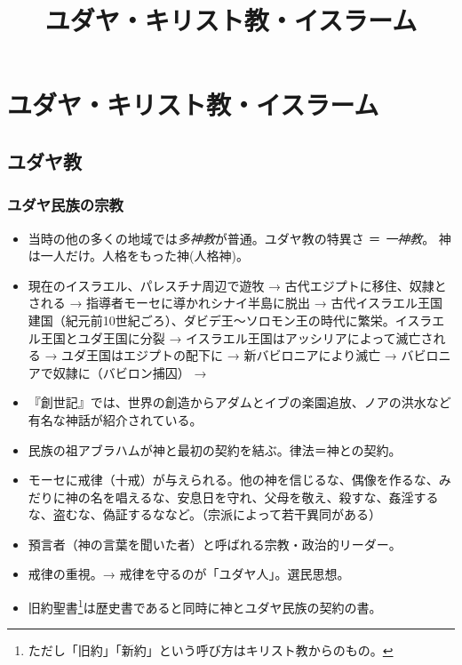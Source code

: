 \documentclass[uplatex,dvipdfmx]{jsarticle} \usepackage{mystyle}%
\title{ユダヤ・キリスト教・イスラーム}
\begin{document}
\maketitle


\else\chapter{ユダヤ・キリスト教・イスラーム}

\fi
\section{ユダヤ教}


\subsection{ユダヤ民族の宗教}






\begin{itemize}
\item 当時の他の多くの地域では\emph{多神教}が普通。ユダヤ教の特異さ ＝ \emph{一神教}。
  神は一人だけ。人格をもった神(人格神)。
\item 現在のイスラエル、パレスチナ周辺で遊牧 → 古代エジプトに移住、奴隷とされる → 指導者モーセに導かれシナイ半島に脱出 → 古代イスラエル王国建国（紀元前10世紀ごろ）、ダビデ王〜ソロモン王の時代に繁栄。イスラエル王国とユダ王国に分裂 → イスラエル王国はアッシリアによって滅亡される → ユダ王国はエジプトの配下に → 新バビロニアにより滅亡 → バビロニアで奴隷に（バビロン捕囚） → 
\item 『創世記』では、世界の創造からアダムとイブの楽園追放、ノアの洪水など有名な神話が紹介されている。
\item 民族の祖アブラハムが神と最初の契約を結ぶ。律法＝神との契約。
\item モーセに戒律（十戒）が与えられる。他の神を信じるな、偶像を作るな、みだりに神の名を唱えるな、安息日を守れ、父母を敬え、殺すな、姦淫するな、盗むな、偽証するななど。（宗派によって若干異同がある）
\item 預言者（神の言葉を聞いた者）と呼ばれる宗教・政治的リーダー。
\item 戒律の重視。→ 戒律を守るのが「ユダヤ人」。選民思想。
\item 旧約聖書\footnote{ただし「旧約」「新約」という呼び方はキリスト教からのもの。}は歴史書であると同時に神とユダヤ民族の契約の書。

\end{itemize}
\end{document}
